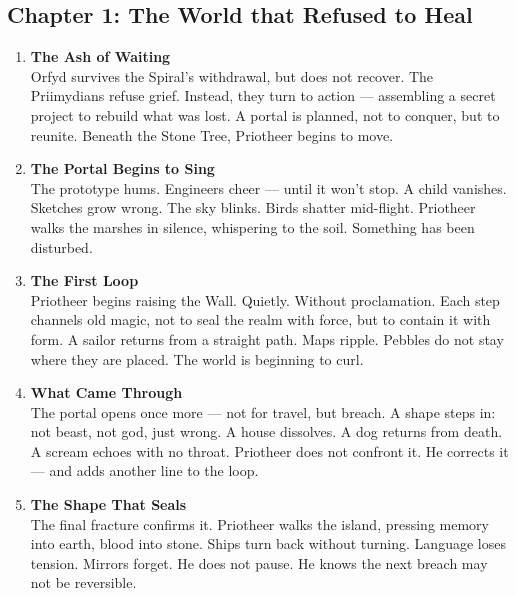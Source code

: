 \documentclass[9pt]{article}
\begin{document}
\newpage

\subsection*{Chapter 1: The World that Refused to Heal}

\vspace{1in}

\begin{enumerate}
    \item \textbf{The Ash of Waiting} \\
    Orfyd survives the Spiral’s withdrawal, but does not recover. The Priimydians refuse grief. Instead, they turn to action — assembling a secret project to rebuild what was lost. A portal is planned, not to conquer, but to reunite. Beneath the Stone Tree, Priotheer begins to move.

    \vspace{1em}
    \item \textbf{The Portal Begins to Sing} \\
    The prototype hums. Engineers cheer — until it won’t stop. A child vanishes. Sketches grow wrong. The sky blinks. Birds shatter mid-flight. Priotheer walks the marshes in silence, whispering to the soil. Something has been disturbed.

    \vspace{1em}
    \item \textbf{The First Loop} \\
    Priotheer begins raising the Wall. Quietly. Without proclamation. Each step channels old magic, not to seal the realm with force, but to contain it with form. A sailor returns from a straight path. Maps ripple. Pebbles do not stay where they are placed. The world is beginning to curl.

    \vspace{1em}
    \item \textbf{What Came Through} \\
    The portal opens once more — not for travel, but breach. A shape steps in: not beast, not god, just wrong. A house dissolves. A dog returns from death. A scream echoes with no throat. Priotheer does not confront it. He corrects it — and adds another line to the loop.

    \vspace{1em}
    \item \textbf{The Shape That Seals} \\
    The final fracture confirms it. Priotheer walks the island, pressing memory into earth, blood into stone. Ships turn back without turning. Language loses tension. Mirrors forget. He does not pause. He knows the next breach may not be reversible.


\end{enumerate}
\end{document}
